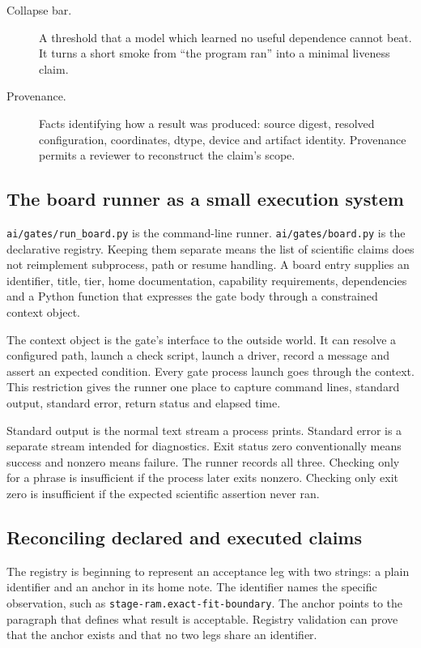 \documentclass[10pt,aps,prd,twocolumn,nofootinbib]{revtex4-2}
\newcommand{\code}[1]{\texttt{#1}}
\begin{document}
\begin{description}
  \item[Collapse bar.] A threshold that a model which learned no useful
  dependence cannot beat.  It turns a short smoke from ``the program ran''
  into a minimal liveness claim.

  \item[Provenance.] Facts identifying how a result was produced: source
  digest, resolved configuration, coordinates, dtype, device and artifact
  identity.  Provenance permits a reviewer to reconstruct the claim's scope.
\end{description}

\subsection{The board runner as a small execution system}

\code{ai/gates/run\_board.py} is the command-line runner.
\code{ai/gates/board.py} is the declarative registry.  Keeping them separate
means the list of scientific claims does not reimplement subprocess, path or
resume handling.  A board entry supplies an identifier, title, tier, home
documentation, capability requirements, dependencies and a Python function
that expresses the gate body through a constrained context object.

The context object is the gate's interface to the outside world.  It can
resolve a configured path, launch a check script, launch a driver, record a
message and assert an expected condition.  Every gate process launch goes
through the context.  This restriction gives the runner one place to
capture command lines, standard output, standard error, return status and
elapsed time.

Standard output is the normal text stream a process prints.  Standard error is
a separate stream intended for diagnostics.  Exit status zero conventionally
means success and nonzero means failure.  The runner records all three.
Checking only for a phrase is insufficient if the process later exits
nonzero.  Checking only exit zero is insufficient if the expected scientific
assertion never ran.

\subsection{Reconciling declared and executed claims}

The registry is beginning to represent an acceptance leg with two strings: a
plain identifier and an anchor in its home note.  The identifier names the
specific observation, such as \code{stage-ram.exact-fit-boundary}.  The anchor
points to the paragraph that defines what result is acceptable.  Registry
validation can prove that the anchor exists and that no two legs share an
identifier.
\end{document}
